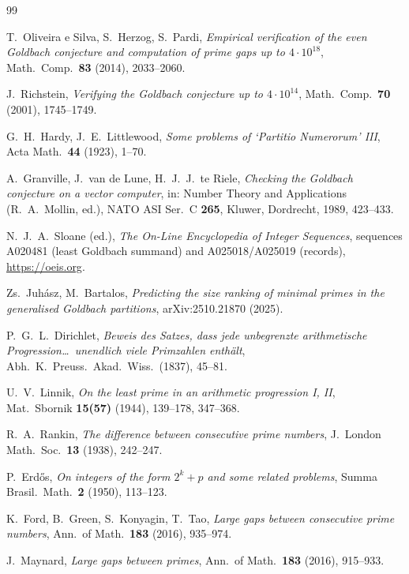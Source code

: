 \documentclass[11pt,oneside]{report}
\theoremstyle{plain}
\theoremstyle{definition}
\theoremstyle{remark}
\begin{document}
\begin{thebibliography}{99}

 T.~Oliveira e Silva, S.~Herzog, S.~Pardi, \emph{Empirical
verification of the even Goldbach conjecture and computation of prime
gaps up to $4\cdot10^{18}$}, Math.\ Comp.\ \textbf{83} (2014), 2033--2060.

 J.~Richstein, \emph{Verifying the Goldbach conjecture
up to $4\cdot10^{14}$}, Math.\ Comp.\ \textbf{70} (2001), 1745--1749.

 G.~H.~Hardy, J.~E.~Littlewood, \emph{Some problems of
`Partitio Numerorum' III}, Acta Math.\ \textbf{44} (1923), 1--70.

 A.~Granville, J.~van de Lune, H.~J.~J.~te Riele,
\emph{Checking the Goldbach conjecture on a vector computer}, in: Number
Theory and Applications (R.~A.~Mollin, ed.), NATO ASI Ser.~C
\textbf{265}, Kluwer, Dordrecht, 1989, 423--433.

 N.~J.~A.~Sloane (ed.), \emph{The On-Line Encyclopedia of
Integer Sequences}, sequences A020481 (least Goldbach summand) and
A025018/A025019 (records), \url{https://oeis.org}.

 Zs.~Juh\'asz, M.~Bartalos, \emph{Predicting the size ranking
of minimal primes in the generalised Goldbach partitions},
arXiv:2510.21870 (2025).

 P.~G.~L.~Dirichlet, \emph{Beweis des Satzes, dass
jede unbegrenzte arithmetische Progression\dots\ unendlich viele
Primzahlen enth\"alt}, Abh.\ K.\ Preuss.\ Akad.\ Wiss.\ (1837), 45--81.

 U.~V.~Linnik, \emph{On the least prime in an arithmetic
progression I, II}, Mat.\ Sbornik \textbf{15(57)} (1944), 139--178,
347--368.

 R.~A.~Rankin, \emph{The difference between consecutive
prime numbers}, J.\ London Math.\ Soc.\ \textbf{13} (1938), 242--247.

 P.~Erd\H{o}s, \emph{On integers of the form $2^k+p$
and some related problems}, Summa Brasil.\ Math.\ \textbf{2} (1950),
113--123.

 K.~Ford, B.~Green, S.~Konyagin, T.~Tao, \emph{Large gaps
between consecutive prime numbers}, Ann.\ of Math.\ \textbf{183} (2016),
935--974.

 J.~Maynard, \emph{Large gaps between primes}, Ann.\ of
Math.\ \textbf{183} (2016), 915--933.


\end{thebibliography}
\end{document}
